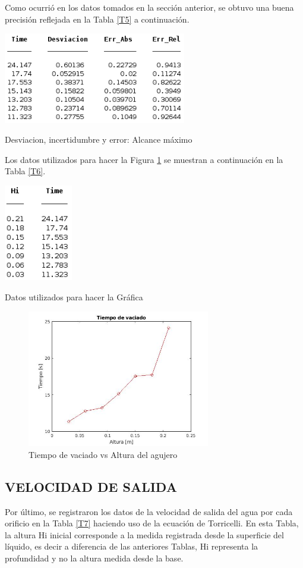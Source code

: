 \documentclass[journal,transmag]{IEEEtran}
\begin{document}
Como ocurrió en los datos tomados en la sección anterior, se obtuvo una buena precisión reflejada en la Tabla \ref{T5} a continuación.   
\begin{table}[!h]
\center
\includegraphics[width=8cm]{tabla5.png}
\caption{Desviacion, incertidumbre y error: Alcance máximo}
\label{T5}
\end{table}

Los datos utilizados para hacer la Figura \ref{G2} se muestran a continuación en la Tabla \ref{T6}. 
\begin{table}[!h]
\center
\includegraphics[width=3cm]{tabla6.png}
\caption{Datos utilizados para hacer la Gráfica}
\label{T6}
\end{table}
  \begin{figure}[!h]
\center
\includegraphics[width=8cm]{grafica2.jpg}
\caption{Tiempo de vaciado vs Altura del agujero}
\label{G2}
\end{figure} 

\subsection{VELOCIDAD DE SALIDA}
Por último, se registraron los datos de la velocidad de salida del agua por cada orificio en la Tabla \ref{T7} haciendo uso de la ecuación de Torricelli. En esta Tabla, la altura Hi inicial corresponde a la medida registrada desde la superficie del líquido, es decir a diferencia de las anteriores Tablas, Hi representa la profundidad y no la altura medida desde la base. 
\end{document}
